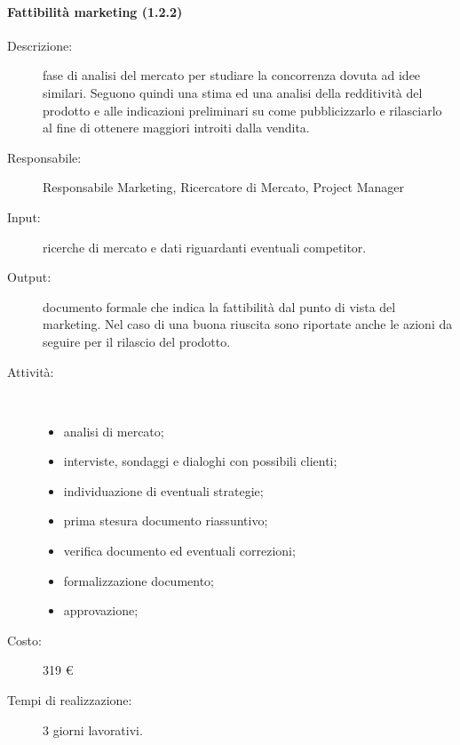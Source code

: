\paragraph{Fattibilit\`{a} marketing (1.2.2)}
\begin{description}
\item[Descrizione:] fase di analisi del mercato per studiare la concorrenza dovuta ad idee similari. Seguono quindi una stima ed una analisi della redditivit\`{a} del prodotto e alle indicazioni preliminari su come pubblicizzarlo e rilasciarlo al fine di ottenere maggiori introiti dalla vendita.
\item[Responsabile:] Responsabile Marketing, Ricercatore di Mercato, Project Manager
\item[Input:] ricerche di mercato e dati riguardanti eventuali competitor.
\item[Output:] documento formale che indica la fattibilità dal punto di vista del marketing. Nel caso di una buona riuscita sono riportate anche le azioni da seguire per il rilascio del prodotto.
\item[Attività:]\mbox{}\\[-1.5\baselineskip]
	\begin{itemize}
	\item analisi di mercato;
	\item interviste, sondaggi e dialoghi con possibili clienti;
	\item individuazione di eventuali strategie;
	\item prima stesura documento riassuntivo;
	\item verifica documento ed eventuali correzioni;
	\item formalizzazione documento;
	\item approvazione;
	\end{itemize}
\item[Costo:] 319 \euro{}
\item[Tempi di realizzazione:] 3 giorni lavorativi.
\end{description}

